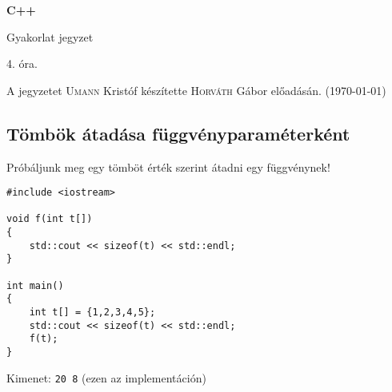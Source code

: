 \documentclass[a4paper,11.5pt]{article}
\begin{document}
	\setlength\parindent{0pt}
	\def\s{\hspace{0.2mm}\vphantom{\beta}}
	\def\Z{\mathbb{Z}}
	\def\Q{\mathbb{Q}}
	\def\R{\mathbb{R}}
	\def\C{\mathbb{C}}
	\def\N{\mathbb{N}}
	\def\Ra{\overline{\mathbb{R}}}
	
	\def\sume{\displaystyle\sum_{n=1}^{+\infty}}
	\def\sumn{\displaystyle\sum_{n=0}^{+\infty}}
	
	\def\narrow{\underset{n\rightarrow+\infty}{\longrightarrow}}
	\def\limn{\displaystyle\lim_{n\to +\infty}}
	\def\limx{\displaystyle\lim_{x\to +\infty}}
	
	\theoremstyle{definition}
	\newtheorem{theorem}{Tétel}[subsection] 
	
	\theoremstyle{definition}
	\newtheorem{definition}[theorem]{Definíció} 
	\newtheorem{example}[theorem]{Példa} 
	\newtheorem{task}[theorem]{Feladat} 
	\newtheorem{note}[theorem]{Megjegyzés}
	\begin{center}
		{\LARGE\textbf{C++}}
		
		{\Large Gyakorlat jegyzet}
		
		4. óra.
	\end{center}
	A jegyzetet \textsc{Umann} Kristóf készítette \textsc{Horváth} Gábor  előadásán. (\today)
	
	\subsection{Tömbök átadása függvényparaméterként}
	Próbáljunk meg egy tömböt érték szerint átadni egy függvénynek!
	\begin{lstlisting}
#include <iostream>

void f(int t[])
{
	std::cout << sizeof(t) << std::endl;
}

int main()
{
	int t[] = {1,2,3,4,5};
	std::cout << sizeof(t) << std::endl;
	f(t);
}
	\end{lstlisting}
	Kimenet: \texttt{20 8} (ezen az implementáción)
	
\end{document}
